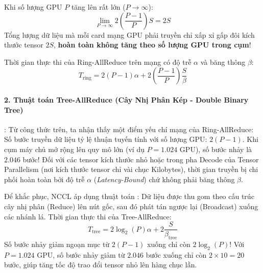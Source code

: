 \begin{theorem}
Khi số lượng GPU $P$ tăng lên rất lớn ($P \to \infty$):
\begin{equation}
\lim_{P \to \infty} 2 \left(\frac{P - 1}{P}\right) S = 2S
\end{equation}
Tổng lượng dữ liệu mà mỗi card mạng GPU phải truyền chỉ xấp xỉ gấp đôi kích thước tensor $2S$, \textbf{hoàn toàn không tăng theo số lượng GPU trong cụm}!
\end{theorem}

Thời gian thực thi của Ring-AllReduce trên mạng có độ trễ $\alpha$ và băng thông $\beta$:
\begin{equation}
T_{\text{ring}} = 2(P - 1)\alpha + 2 \left(\frac{P - 1}{P}\right) \frac{S}{\beta}
\end{equation}

\paragraph{2. Thuật toán Tree-AllReduce (Cây Nhị Phân Kép - Double Binary Tree)}:
Từ công thức trên, ta nhận thấy một điểm yếu chí mạng của Ring-AllReduce: Số bước truyền dữ liệu tỷ lệ thuận tuyến tính với số lượng GPU: $2(P - 1)$.
Khi cụm máy chủ mở rộng lên quy mô lớn (ví dụ $P = 1.024$ GPU), số bước nhảy là $2.046$ bước!
Đối với các tensor kích thước nhỏ hoặc trong pha Decode của Tensor Parallelism (nơi kích thước tensor chỉ vài chục Kilobytes), thời gian truyền bị chi phối hoàn toàn bởi độ trễ $\alpha$ (\textit{Latency-Bound}) chứ không phải băng thông $\beta$.

Để khắc phục, NCCL áp dụng thuật toán : Dữ liệu được thu gom theo cấu trúc cây nhị phân (Reduce) lên nút gốc, sau đó phát tán ngược lại (Broadcast) xuống các nhánh lá.
Thời gian thực thi của Tree-AllReduce:
\begin{equation}
T_{\text{tree}} = 2 \log_2(P) \alpha + 2 \frac{S}{\beta_{\text{tree}}}
\end{equation}
Số bước nhảy giảm ngoạn mục từ $2(P - 1)$ xuống chỉ còn $2 \log_2(P)$! Với $P = 1.024$ GPU, số bước nhảy giảm từ $2.046$ bước xuống chỉ còn $2 \times 10 = 20$ bước, giúp tăng tốc độ trao đổi tensor nhỏ lên hàng chục lần.

